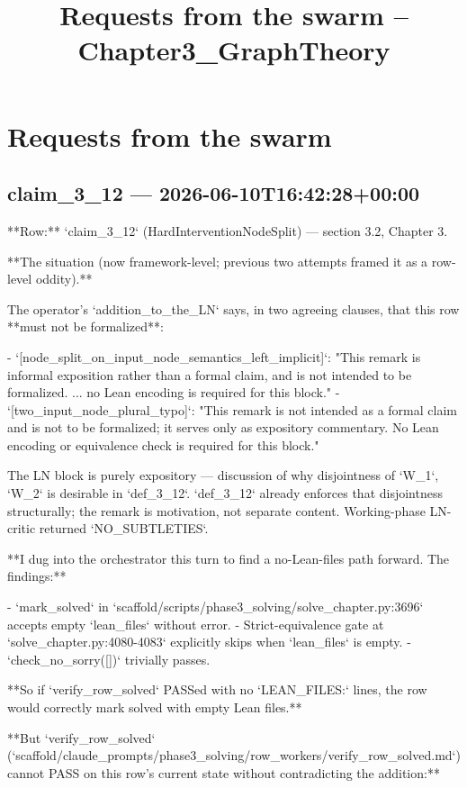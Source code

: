 \documentclass[12pt, a4paper]{scrartcl}
\title{Requests from the swarm -- Chapter3_GraphTheory}
\begin{document}
\maketitle

\section*{Requests from the swarm}
\subsection*{claim_3_12 — 2026-06-10T16:42:28+00:00}
**Row:** `claim_3_12` (HardInterventionNodeSplit) — section 3.2, Chapter 3.

**The situation (now framework-level; previous two attempts framed it as a row-level oddity).**

The operator's `addition_to_the_LN` says, in two agreeing clauses, that this row **must not be formalized**:

- `[node_split_on_input_node_semantics_left_implicit]`: "This remark is informal exposition rather than a formal claim, and is not intended to be formalized. ... no Lean encoding is required for this block."
- `[two_input_node_plural_typo]`: "This remark is not intended as a formal claim and is not to be formalized; it serves only as expository commentary. No Lean encoding or equivalence check is required for this block."

The LN block is purely expository — discussion of why disjointness of `W_1`, `W_2` is desirable in `def_3_12`. `def_3_12` already enforces that disjointness structurally; the remark is motivation, not separate content. Working-phase LN-critic returned `NO_SUBTLETIES`.

**I dug into the orchestrator this turn to find a no-Lean-files path forward. The findings:**

- `mark_solved` in `scaffold/scripts/phase3_solving/solve_chapter.py:3696` accepts empty `lean_files` without error.
- Strict-equivalence gate at `solve_chapter.py:4080-4083` explicitly skips when `lean_files` is empty.
- `check_no_sorry([])` trivially passes.

**So if `verify_row_solved` PASSed with no `LEAN_FILES:` lines, the row would correctly mark solved with empty Lean files.**

**But `verify_row_solved` (`scaffold/claude_prompts/phase3_solving/row_workers/verify_row_solved.md`) cannot PASS on this row's current state without contradicting the addition:**
\end{document}
